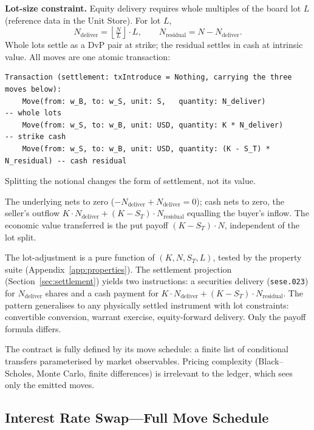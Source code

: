 \noindent\textbf{Lot-size constraint.} Equity delivery requires whole multiples of the board lot $L$ (reference data in the Unit Store). For lot $L$,
\[
N_{\text{deliver}} = \left\lfloor \tfrac{N}{L} \right\rfloor \cdot L, \qquad N_{\text{residual}} = N - N_{\text{deliver}}.
\]
Whole lots settle as a DvP pair at strike; the residual settles in cash at intrinsic value. All moves are one atomic transaction:

\begin{lstlisting}
Transaction (settlement: txIntroduce = Nothing, carrying the three moves below):
    Move(from: w_B, to: w_S, unit: S,   quantity: N_deliver)            -- whole lots
    Move(from: w_S, to: w_B, unit: USD, quantity: K * N_deliver)        -- strike cash
    Move(from: w_S, to: w_B, unit: USD, quantity: (K - S_T) * N_residual) -- cash residual
\end{lstlisting}

Splitting the notional changes the form of settlement, not its value.

\begin{proposition}
The underlying nets to zero ($-N_{\text{deliver}} + N_{\text{deliver}} = 0$); cash nets to zero, the seller's outflow $K\cdot N_{\text{deliver}} + (K-S_T)\cdot N_{\text{residual}}$ equalling the buyer's inflow. The economic value transferred is the put payoff $(K-S_T)\cdot N$, independent of the lot split.
\end{proposition}

\noindent The lot-adjustment is a pure function of $(K, N, S_T, L)$, tested by the property suite (Appendix~\ref{app:properties}). The settlement projection (Section~\ref{sec:settlement}) yields two instructions: a securities delivery (\texttt{sese.023}) for $N_{\text{deliver}}$ shares and a cash payment for $K\cdot N_{\text{deliver}} + (K-S_T)\cdot N_{\text{residual}}$. The pattern generalises to any physically settled instrument with lot constraints: convertible conversion, warrant exercise, equity-forward delivery. Only the payoff formula differs.

The contract is fully defined by its move schedule: a finite list of conditional transfers parameterised by market observables. Pricing complexity (Black--Scholes, Monte Carlo, finite differences) is irrelevant to the ledger, which sees only the emitted moves.

\subsection{Interest Rate Swap---Full Move Schedule}

